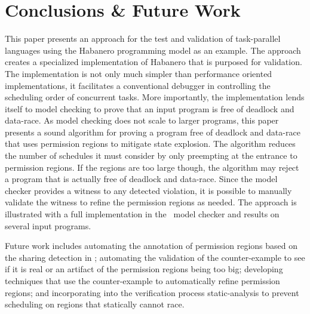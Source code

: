 \section{Conclusions \& Future Work}
This paper presents an approach for the test and validation of
task-parallel languages using the Habanero programming model as an
example. The approach creates a specialized implementation of
Habanero that is purposed for validation. The implementation
is not only much simpler than performance oriented implementations, it
facilitates a conventional debugger in controlling the
scheduling order of concurrent tasks. More importantly, the
implementation lends itself to model checking to prove that an input
program is free of deadlock and data-race.
As model checking does not scale to larger programs, this paper
presents a sound algorithm for proving a program free of deadlock and
data-race that uses permission regions to mitigate state
explosion. The algorithm reduces the number of schedules it must
consider by only preempting at the entrance to permission regions. If
the regions are too large though, the algorithm may reject a program
that is actually free of deadlock and data-race. Since the model
checker provides a witness to any detected violation, it is possible to
manually validate the witness to refine the permission regions as needed. The
approach is illustrated with a full implementation in the \jpf\ model
checker and results on several input programs.

Future work includes automating the annotation of permission regions
based on the sharing detection in \jpf; automating the validation of
the counter-example to see if it is real or an artifact  of the
permission regions being too big; developing techniques that use the
counter-example to automatically refine permission regions; and
incorporating into the verification process static-analysis to prevent
scheduling on regions that statically cannot race.

